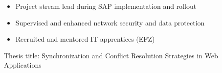 \documentclass[10pt,a4paper]{altacv}
\begin{document}
\begin{itemize}
\item Project stream lead during SAP implementation and rollout
\item Supervised and enhanced network security and data protection
\item Recruited and mentored IT apprentices (EFZ)
\end{itemize}
\divider


Thesis title: Synchronization and Conflict Resolution Strategies in Web Applications
\divider

\end{document}
